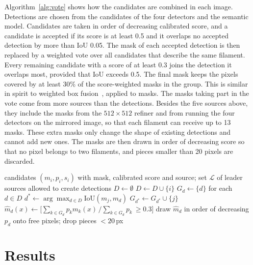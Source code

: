 \documentclass[conference]{IEEEtran}
\begin{document}
Algorithm~\ref{alg:vote} shows how the candidates are combined in each image. Detections are chosen from the candidates of the four detectors and the semantic model. Candidates are taken in order of decreasing calibrated score, and a candidate is accepted if its score is at least 0.5 and it overlaps no accepted detection by more than IoU 0.05. The mask of each accepted detection is then replaced by a weighted vote over all candidates that describe the same filament. Every remaining candidate with a score of at least 0.3 joins the detection it overlaps most, provided that IoU exceeds 0.5. The final mask keeps the pixels covered by at least 30\% of the score-weighted masks in the group. This is similar in spirit to weighted box fusion~\cite{solovyev2021wbf}, applied to masks. The masks taking part in the vote come from more sources than the detections. Besides the five sources above, they include the masks from the $512\times512$ refiner and from running the four detectors on the mirrored image, so that each filament can receive up to 13 masks. These extra masks only change the shape of existing detections and cannot add new ones. The masks are then drawn in order of decreasing score so that no pixel belongs to two filaments, and pieces smaller than 20 pixels are discarded.

\begin{algorithm}[t]
\caption{Selecting detections and voting on their masks (one image)}
\label{alg:vote}
\begin{algorithmic}[1]
\Require candidates $(m_i, p_i, s_i)$ with mask, calibrated score and source; set $\mathcal{L}$ of leader sources allowed to create detections
\State $D \gets \emptyset$
    $D \gets D\cup\{i\}$
  \EndIf
\EndFor
\State $G_d \gets \{d\}$ for each $d\in D$
  \State $d^\ast \gets \arg\max_{d\in D}\mathrm{IoU}(m_j,m_d)$
   $G_{d^\ast}\gets G_{d^\ast}\cup\{j\}$ \EndIf
\EndFor
{}
  \State $\hat m_d(x) \gets \big[\sum_{k\in G_d}p_k m_k(x) \,/ \sum_{k\in G_d}p_k \ \ge 0.3\big]$
\EndFor
\State draw $\hat m_d$ in order of decreasing $p_d$ onto free pixels; drop pieces $<20$\,px
\end{algorithmic}
\end{algorithm}

\section{Results}
\label{sec:results}
\end{document}
